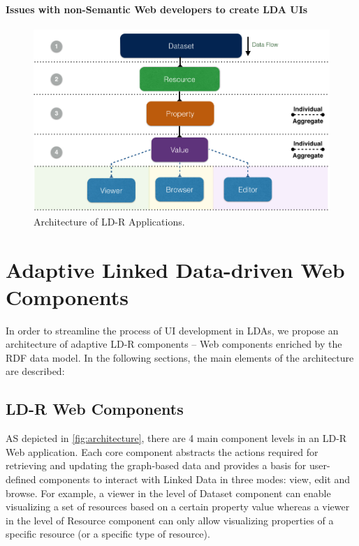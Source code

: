 \documentclass{acm_proc_article-sp}
\begin{document}
\paragraph{Issues with non-Semantic Web developers to create LDA UIs}

\begin{figure}[tb]
  \includegraphics[width=1\linewidth]{images/architecture.jpg}
  \caption{Architecture of LD-R Applications.}
  \label{fig:architecture}
\end{figure}

\section{Adaptive Linked Data-driven Web Components}
In order to streamline the process of UI development in LDAs, we propose an architecture of adaptive LD-R components -- Web components enriched by the RDF data model.
In the following sections, the main elements of the architecture are described:

\subsection{LD-R Web Components}
AS depicted in \autoref{fig:architecture}, there are 4 main component levels in an LD-R Web application.
Each core component abstracts the actions required for retrieving and updating the graph-based data and provides a basis for user-defined components to interact with Linked Data in three modes: view, edit and browse.
For example, a viewer in the level of Dataset component can enable visualizing a set of resources based on a certain property value whereas a viewer in the level of Resource component can only allow visualizing properties of a specific resource (or a specific type of resource).
\end{document}
